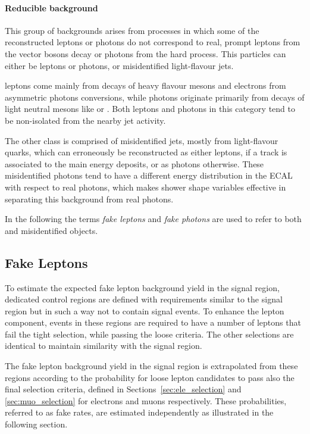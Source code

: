\paragraph{Reducible background\\}
This group of backgrounds arises from processes in which some of the reconstructed leptons or photons do not correspond to real, prompt leptons from the vector bosons decay or photons from the hard process.
This particles can either be \nonprompt leptons or photons, or misidentified light-flavour jets.

\Nonprompt leptons come mainly from decays of heavy flavour mesons and electrons from asymmetric photons conversions,
while \nonprompt photons originate primarily from decays of light neutral mesons like \PGpz or \PGh.
Both leptons and photons in this category tend to be non-isolated from the nearby jet activity.

The other class is comprised of misidentified jets, mostly from light-flavour quarks, which can erroneously be reconstructed as either leptons,
if a track is associated to the main energy deposits, or as photons otherwise.
These misidentified photons tend to have a different energy distribution in the ECAL with respect to real photons,
which makes shower shape variables effective in separating this background from real photons.

In the following the terms \textit{fake leptons} and \textit{fake photons} are used to refer to both \nonprompt and misidentified objects.

\subsection{Fake Leptons}
\label{sec:fake_leptons}
To estimate the expected fake lepton background yield in the signal region,
dedicated control regions are defined with requirements similar to the signal region but in such a way not to contain signal events.
To enhance the \nonprompt lepton component, events in these regions are required to
have a number of leptons that fail the tight selection, while passing the loose criteria.
The other selections are identical to maintain similarity with the signal region.

The fake lepton background yield in the signal region is extrapolated from these regions
according to the probability for loose lepton candidates to pass also the final selection criteria,
defined in Sections~\ref{sec:ele_selection} and \ref{sec:muo_selection} for electrons and muons respectively.
These probabilities, referred to as fake rates, are estimated independently as illustrated in the following section.

